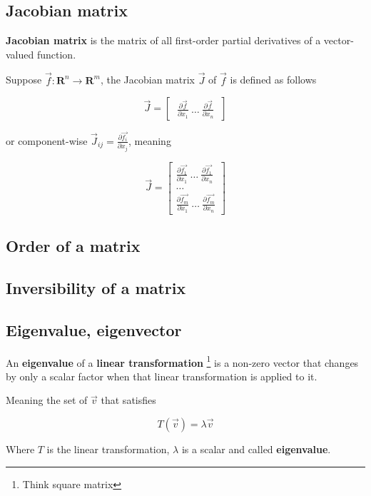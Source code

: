 \documentclass{article}
\begin{document}
\subsection{Jacobian matrix}

\textbf{Jacobian matrix} is the matrix of all first-order partial derivatives of a vector-valued function.

Suppose $\vec{f} : \mathbf{R}^n \to \mathbf{R}^m$, the Jacobian matrix $\vec{J}$ of $\vec{f}$ is defined as follows

$$
\vec{J} = \begin{bmatrix} ~ \frac{\partial \vec{f}}{\partial x_1} ~ \dots ~ \frac{\partial \vec{f}}{\partial x_n} ~ \end{bmatrix}
$$

or component-wise $\vec{J}_{ij} = \frac{\partial \vec{f_i}}{\partial x_j}$, meaning

$$
\vec{J} = 
 \begin{bmatrix}
  \frac{\partial \vec{f_1}}{\partial x_1} ~ \dots ~ \frac{\partial \vec{f_1}}{\partial x_n} \\
  \dots \\
  \frac{\partial \vec{f_m}}{\partial x_1} ~ \dots ~ \frac{\partial \vec{f_m}}{\partial x_n}
 \end{bmatrix}
$$

\subsection{Order of a matrix}



\subsection{Inversibility of a matrix}



\subsection{Eigenvalue, eigenvector}

An \textbf{eigenvalue} of a \textbf{linear transformation} \footnote{Think square matrix} is a non-zero vector that changes by only a scalar factor when that linear transformation is applied to it.

Meaning the set of $\vec{v}$ that satisfies

$$
T(\vec{v}) = \lambda \vec{v}
$$

Where $T$ is the linear transformation, $\lambda$ is a scalar and called \textbf{eigenvalue}.
\end{document}
